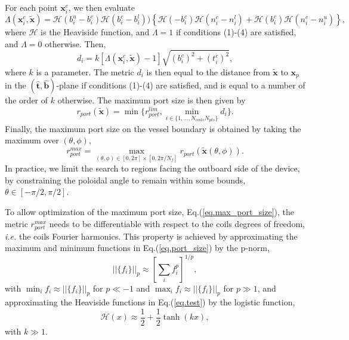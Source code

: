 \documentclass[12pt]{article}
\begin{document}
For each point $\mathbf{x}^c_i$, we then evaluate
\begin{equation}
    \Lambda(\mathbf{x}^c_i,\tilde{\mathbf{x}}) = \mathcal{H}(b^u_i-b^c_i)\mathcal{H}(b^c_i-b^l_i))\left\{\mathcal{H}(-b^c_i)\mathcal{H}(n^c_i-n^l_i)+\mathcal{H}(b^c_i)\mathcal{H}(n^c_i-n^u_i)\right\},\label{eq.test}
\end{equation}
where $\mathcal{H}$ is the Heaviside function, and $\Lambda=1$ if conditions (1)-(4) are satisfied, and $\Lambda=0$ otherwise. Then,
\begin{equation}
    d_i = k\left[\Lambda(\mathbf{x}^c_i,\tilde{\mathbf{x}})-1\right]\sqrt{(b^c_i)^2 + (t^c_i)^2}, 
\end{equation}
where $k$ is a parameter. The metric $d_i$ is then equal to the distance from $\tilde{\mathbf{x}}$ to $\mathbf{x}_p$ in the $(\hat{\mathbf{t}},\hat{\textbf{b}})$-plane if conditions (1)-(4) are satisfied, and is equal to a number of the order of $k$ otherwise. The maximum port size is then given by
\begin{equation}
    r_{port}(\tilde{\mathbf{x}}) = \min\{r_{port}^{lim}, \min_{i\in\{1,\ldots,N_{coils}N_{pts}\}}d_i\}. \label{eq.port_size}
\end{equation}
Finally, the maximum port size on the vessel boundary is obtained by taking the maximum over $(\theta,\phi)$,
\begin{equation}
    r^{max}_{port} = \max_{(\theta,\phi)\in[0,2\pi]\times[0,2\pi/N_f]}r_{port}(\tilde{\mathbf{x}}(\theta,\phi)). \label{eq.max_port_size}
\end{equation}
In practice, we limit the search to regions facing the outboard side of the device, by constraining the poloidal angle to remain within some bounds, $\theta\in[-\pi/2,\pi/2]$.

To allow optimization of the maximum port size, Eq.(\ref{eq.max_port_size}), the metric $r^{max}_{port}$ needs to be differentiable with respect to the coils degrees of freedom, \textit{i.e.} the coils Fourier harmonics. This property is achieved by approximating the maximum and minimum functions in Eq.(\ref{eq.port_size}) by the p-norm,
\begin{equation}
    ||\{f_i\}||_p \approx \left[\sum_i f_i^{p}\right]^{1/p},
\end{equation}
with $\min_i f_i \approx ||\{f_i\}||_p$ for $p\ll-1$ and $\max_i f_i \approx ||\{f_i\}||_p$ for $p\gg1$, and approximating the Heaviside functions in Eq.(\ref{eq.test}) by the logistic function,
\begin{equation}
    \mathcal{H}(x) \approx \frac{1}{2} + \frac{1}{2}\tanh(kx),
\end{equation}
with $k\gg1$. 
\end{document}
